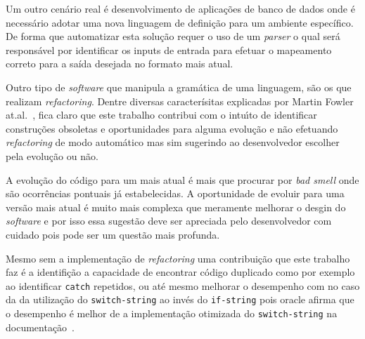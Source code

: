 Um outro cen\'{a}rio real \'{e} desenvolvimento de aplica\c{c}\~{o}es de banco de dados onde \'{e} necess\'{a}rio adotar uma nova linguagem de defini\c{c}\~{a}o para um ambiente espec\'{i}fico. De forma que automatizar esta solu\c{c}\~{a}o requer o uso de um \textit{parser} o qual ser\'{a} respons\'{a}vel por identificar os inputs de entrada para efetuar o mapeamento correto para a sa\'{i}da desejada no formato mais atual.

Outro tipo de \textit{software} que manipula a gram\'{a}tica de uma linguagem, s\~{a}o os que realizam \textit{refactoring}. Dentre diversas caracter\'{i}sitas explicadas por Martin Fowler at.al.~\cite{martinFowlerRafactoring}, fica claro que este trabalho contribui com o intu\'{\i}to de identificar constru\c{c}\~{o}es obsoletas e oportunidades para alguma evolu\c{c}\~{a}o e n\~{a}o efetuando \textit{refactoring} de modo autom\'{a}tico mas sim sugerindo ao desenvolvedor escolher pela evolu\c{c}\~{a}o ou n\~{a}o.

A evolu\c{c}\~{a}o do c\'{o}digo para um mais atual \'{e} mais que procurar por \textit{bad smell} onde s\~{a}o ocorr\^{e}ncias pontuais j\'{a} estabelecidas. A oportunidade de evoluir para uma vers\~{a}o mais atual \'{e} muito mais complexa que meramente melhorar o desgin do \textit{software} e por isso essa sugest\~{a}o deve ser apreciada pelo desenvolvedor com cuidado pois pode ser um quest\~{a}o mais profunda. %

Mesmo sem a implementa\c{c}\~{a}o de \textit{refactoring} uma contribui\c{c}\~{a}o que este trabalho faz \'{e} a identifi\c{c}\~{a}o a capacidade de encontrar c\'{o}digo duplicado como por exemplo ao identificar \texttt{catch} repetidos, ou at\'{e} mesmo melhorar o desempenho com no caso da da utiliza\c{c}\~{a}o do \texttt{switch-string} ao inv\'{e}s do \texttt{if-string} pois oracle afirma que o desempenho \'{e} melhor de a implementa\c{c}\~{a}o otimizada do \texttt{switch-string} na documenta\c{c}\~{a}o~\cite{docSwitch}.




